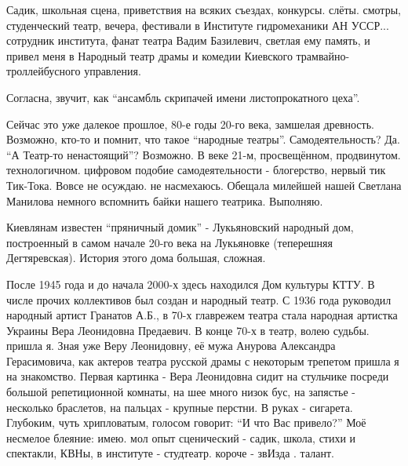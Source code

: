 Садик, школьная сцена, приветствия на всяких съездах, конкурсы. слёты. смотры,
студенческий театр, вечера, фестивали в Институте гидромеханики АН
УССР... сотрудник института, фанат театра Вадим Базилевич, светлая ему память,
и привел меня в Народный театр драмы и комедии Киевского
трамвайно-троллейбусного управления. 

Согласна, звучит, как  \enquote{ансамбль скрипачей  имени листопрокатного цеха}.


Сейчас это уже далекое прошлое, 80-е годы 20-го века, замшелая древность.
Возможно, кто-то и помнит, что такое \enquote{народные театры}. Самодеятельность? Да.
\enquote{А Театр-то ненастоящий}? Возможно.  В веке 21-м, просвещённом, продвинутом.
технологичном. цифровом подобие самодеятельности - блогерство, нервый тик
Тик-Тока.  Вовсе не осуждаю. не насмехаюсь. Обещала милейшей нашей Светлана
Манилова немного вспомнить байки нашего театрика. Выполняю.

Киевлянам известен \enquote{пряничный домик} - Лукьяновский народный дом, построенный
в самом начале 20-го века на Лукьяновке (теперешняя Дегтяревская). История
этого дома большая, сложная. 

\raggedcolumns
\begin{multicols}{2} %
\setlength{\parindent}{0pt}



\end{multicols} %

После 1945 года  и до начала 2000-х здесь находился Дом культуры КТТУ. В числе
прочих коллективов был создан и народный театр. С  1936 года руководил
народный артист Гранатов А.Б.,  в 70-х  главрежем театра  стала народная
артистка Украины Вера Леонидовна Предаевич.  В конце 70-х в театр, волею
судьбы. пришла я. Зная уже Веру Леонидовну, её мужа Анурова Александра
Герасимовича, как актеров театра русской драмы с некоторым трепетом пришла я на
знакомство. Первая картинка - Вера Леонидовна сидит на стульчике посреди
большой репетиционной комнаты, на шее много низок бус, на запястье - несколько
браслетов, на пальцах - крупные перстни. В руках - сигарета. Глубоким, чуть
хрипловатым, голосом говорит: \enquote{И что Вас привело?} Моё несмелое блеяние: имею.
мол опыт сценический - садик, школа, стихи и спектакли, КВНы, в институте -
студтеатр. короче - звИзда . талант. 

